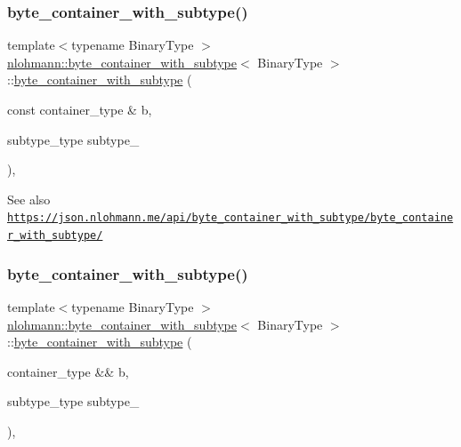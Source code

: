 \subsubsection{\texorpdfstring{byte\+\_\+container\+\_\+with\+\_\+subtype()}{byte\_container\_with\_subtype()}\hspace{0.1cm}{\footnotesize\ttfamily [4/5]}}
{\footnotesize\ttfamily template$<$typename Binary\+Type $>$ \\
\hyperlink{classnlohmann_1_1byte__container__with__subtype}{nlohmann\+::byte\+\_\+container\+\_\+with\+\_\+subtype}$<$ Binary\+Type $>$\+::\hyperlink{classnlohmann_1_1byte__container__with__subtype}{byte\+\_\+container\+\_\+with\+\_\+subtype} (\begin{DoxyParamCaption}\item[{const container\+\_\+type \&}]{b,  }\item[{subtype\+\_\+type}]{subtype\+\_\+ }\end{DoxyParamCaption})\hspace{0.3cm}{\ttfamily [inline]}, {\ttfamily [noexcept]}}

\begin{DoxySeeAlso}{See also}
\href{https://json.nlohmann.me/api/byte_container_with_subtype/byte_container_with_subtype/}{\tt https\+://json.\+nlohmann.\+me/api/byte\+\_\+container\+\_\+with\+\_\+subtype/byte\+\_\+container\+\_\+with\+\_\+subtype/} 
\end{DoxySeeAlso}
\mbox{\label{classnlohmann_1_1byte__container__with__subtype_a8c61acfee31216f530d2bd37571a6ff4}} 
\subsubsection{\texorpdfstring{byte\+\_\+container\+\_\+with\+\_\+subtype()}{byte\_container\_with\_subtype()}\hspace{0.1cm}{\footnotesize\ttfamily [5/5]}}
{\footnotesize\ttfamily template$<$typename Binary\+Type $>$ \\
\hyperlink{classnlohmann_1_1byte__container__with__subtype}{nlohmann\+::byte\+\_\+container\+\_\+with\+\_\+subtype}$<$ Binary\+Type $>$\+::\hyperlink{classnlohmann_1_1byte__container__with__subtype}{byte\+\_\+container\+\_\+with\+\_\+subtype} (\begin{DoxyParamCaption}\item[{container\+\_\+type \&\&}]{b,  }\item[{subtype\+\_\+type}]{subtype\+\_\+ }\end{DoxyParamCaption})\hspace{0.3cm}{\ttfamily [inline]}, {\ttfamily [noexcept]}}

